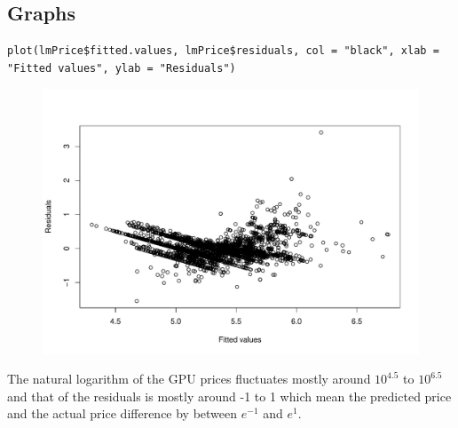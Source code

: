 \documentclass[a4paper]{article}
\begin{document}
\subsection{Graphs}
\begin{mdframed}[leftline=false,rightline=false,backgroundcolor=lightblue!10,nobreak=false]
    \begin{verbatim}
plot(lmPrice$fitted.values, lmPrice$residuals, col = "black", xlab = "Fitted values", ylab = "Residuals")
    \end{verbatim}
\end{mdframed}
\begin{figure}[H]
    \centering
    \includegraphics[keepaspectratio, width=1\textwidth, height=1\textheight]{LRM/Rplot.pdf}
\end{figure}
The natural logarithm of the GPU prices fluctuates mostly around $10^{4.5}$ to $10^{6.5}$ and that of the residuals is mostly around -1 to 1 which mean the predicted price and the actual price difference by between $e^{-1}$ and $e^{1}$.
\end{document}
